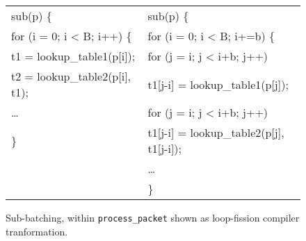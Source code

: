 \begin{figure}[ht]
\begin{small}
\begin{tabular}[b]{l|l}
sub\hspace{0.2cm}{\bf process\_packet}(p) \{ & sub\hspace{0.2cm}{\bf process\_packet}(p) \{\\
\hspace{0.3cm}for (i = 0; i < B; i++) \{ &\hspace{0.3cm}for (i = 0; i < B; i+=b) \{\\
\hspace{0.3cm}t1 = lookup\_table1(p[i]); &\hspace{0.3cm}for (j = i; j < i+b; j++)\\
\hspace{0.3cm}t2 = lookup\_table2(p[i], t1); & \hspace{0.6cm}t1[j-i] = lookup\_table1(p[j]);\\
\hspace{0.3cm}\ldots &\hspace{0.3cm}for (j = i; j < i+b; j++)\\
\} & \hspace{0.6cm}t1[j-i] = lookup\_table2(p[j], t1[j-i]);\\
&\hspace{0.3cm}\ldots\\
&\}\\
\end{tabular}
\end{small}
\caption{\label{fig:loop_fission_subbatch} Sub-batching, within {\tt process\_packet} shown as loop-fission compiler tranformation.}
\end{figure}





